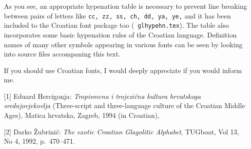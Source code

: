 As you see, an appropriate
hypenation table is necessary to prevent line breaking
between  pairs of letters like  {\tt cc, zz, ss, ch, dd,
ya, ye,} and it has been
included to the Croatian font package too ({\tt
glhypehn.tex}). The table also
incorporates some basic
hypenation rules of the Croatian language.
Definition
names of  many other symbols appearing in various fonts can be seen
by looking into  source files accompaning  this text.

 If you should use Croatian fonts, I would deeply appreciate
if you would inform me.



\medskip



\item{[1]} Eduard Hercigonja: {\it Tropismena i trojezi\v cna
kultura hrvatskoga srednjovjekovlja\/} (Three-script and
three-language culture of the Croatian Middle Ages), Matica
hrvatska,  Zagreb, 1994 (in Croatian),

\item{[2]} Darko \v Zubrini\'c: {\it The exotic Croatian
Glagolitic Alphabet\/}, TUGboat, Vol 13, No 4, 1992, p.\
470--471.


\makesignature
\endarticle

